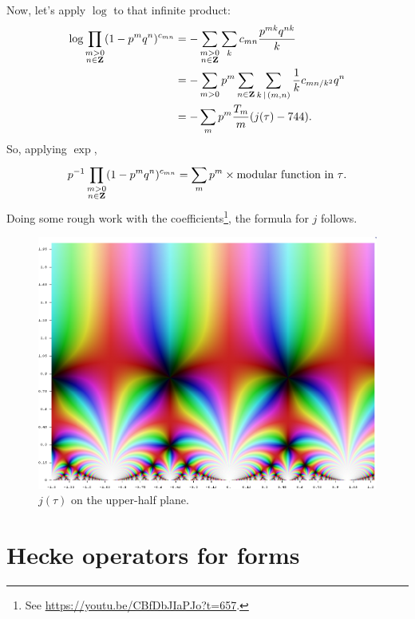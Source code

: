 \documentclass[11pt, oneside,margin=1in]{article}
\begin{document}
Now, let's apply $\log$ to that infinite product:
\begin{align*}
	\log \prod_{\substack{ m > 0\\n\in \mathbf Z}} (1-p^mq^n)^{c_{mn}} &= - \sum_{\substack{m>0\\n\in \mathbf Z}}^{} \sum_{k}^{} c_{mn} \frac{p^{ m k} q^{nk}}{k}\\
								    &= -\sum_{m>0}^{} p^m \sum_{n\in \mathbf Z}^{} \sum_{k\,\mid\,(m,n)}^{} \frac{1}{k} c_{mn/k^2}q^n\\
								    &= - \sum_{m}^{} p^m \frac{T_m}{m}(j(\tau)- 744).
\end{align*}
So, applying $\exp$,
\begin{align*}
	p^{-1} \prod_{\substack{ m > 0\\n\in \mathbf Z}} (1-p^mq^n)^{c_{mn}} = \sum_{m}^{} p^m \times \textrm{modular function in $\tau$}. 
\end{align*}
Doing some rough work with the coefficients\footnote{See \url{https://youtu.be/CBfDbJIaPJo?t=657}.}, the formula for $j$ follows.
\begin{figure}
	\begin{center}
		\includegraphics[scale = 0.4]{j}
                \caption{$j(\tau)$ on the upper-half plane.}
	\end{center}
\end{figure}

\section{Hecke operators for forms}
\end{document}
